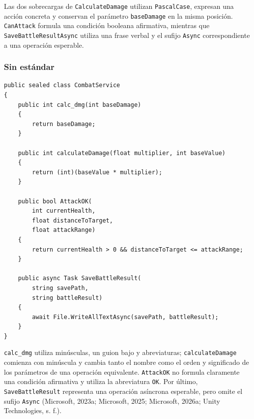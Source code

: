 Las dos sobrecargas de \texttt{CalculateDamage} utilizan \texttt{PascalCase}, expresan una acción concreta y conservan el parámetro \texttt{baseDamage} en la misma posición. \texttt{CanAttack} formula una condición booleana afirmativa, mientras que \texttt{SaveBattleResultAsync} utiliza una frase verbal y el sufijo \texttt{Async} correspondiente a una operación esperable.

\newpage
\subsubsection{Sin estándar}

\begin{lstlisting}[style=csharpstyle]
public sealed class CombatService
{
    public int calc_dmg(int baseDamage)
    {
        return baseDamage;
    }

    public int calculateDamage(float multiplier, int baseValue)
    {
        return (int)(baseValue * multiplier);
    }

    public bool AttackOK(
        int currentHealth,
        float distanceToTarget,
        float attackRange)
    {
        return currentHealth > 0 && distanceToTarget <= attackRange;
    }

    public async Task SaveBattleResult(
        string savePath,
        string battleResult)
    {
        await File.WriteAllTextAsync(savePath, battleResult);
    }
}
\end{lstlisting}

\texttt{calc\_dmg} utiliza minúsculas, un guion bajo y abreviaturas; \texttt{calculateDamage} comienza con minúscula y cambia tanto el nombre como el orden y significado de los parámetros de una operación equivalente. \texttt{AttackOK} no formula claramente una condición afirmativa y utiliza la abreviatura \texttt{OK}. Por último, \texttt{SaveBattleResult} representa una operación asíncrona esperable, pero omite el sufijo \texttt{Async} (Microsoft, 2023a; Microsoft, 2025; Microsoft, 2026a; Unity Technologies, s. f.).
